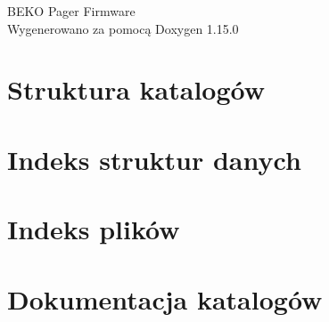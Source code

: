 \documentclass[twoside]{book}
\newcommand{\+}{\discretionary{\mbox{\scriptsize$\hookleftarrow$}}{}{}}
\newcommand{\clearemptydoublepage}{%
    \newpage{\pagestyle{empty}\cleardoublepage}%
  }
\begin{document}
  \raggedbottom
    \hypersetup{pageanchor=false,
                bookmarksnumbered=true,
                pdfencoding=unicode
               }
  \begin{titlepage}
  \vspace*{7cm}
  \begin{center}%
  {\Large BEKO Pager Firmware}\\
  \vspace*{1cm}
  {\large Wygenerowano za pomocą Doxygen 1.15.0}\\
  \end{center}
  \end{titlepage}
  \clearemptydoublepage
  \tableofcontents
  \clearemptydoublepage
  \hypersetup{pageanchor=true}






\chapter{Struktura katalogów}

\chapter{Indeks struktur danych}

\chapter{Indeks plików}

\chapter{Dokumentacja katalogów}






\end{document}
